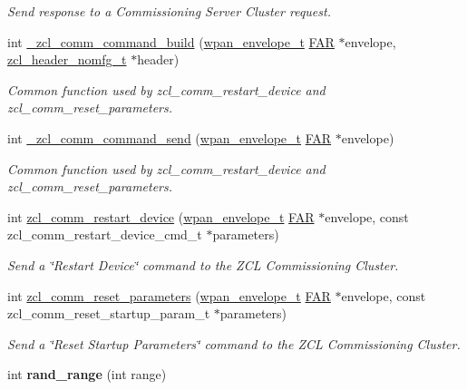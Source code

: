 \begin{DoxyCompactItemize}
\begin{DoxyCompactList}\small\item\em Send response to a Commissioning Server Cluster request. \end{DoxyCompactList}\item 
int \hyperlink{group__zcl__commissioning_ga0eeed24c2ca26aa030876addc4caf67d}{\-\_\-zcl\-\_\-comm\-\_\-command\-\_\-build} (\hyperlink{structwpan__envelope__t}{wpan\-\_\-envelope\-\_\-t} \hyperlink{group__hal_gaef060b3456fdcc093a7210a762d5f2ed}{F\-A\-R} $\ast$envelope, \hyperlink{group__zcl_gae988eb59c8a2e75b6cb34aefeca315d1}{zcl\-\_\-header\-\_\-nomfg\-\_\-t} $\ast$header)
\begin{DoxyCompactList}\small\item\em Common function used by zcl\-\_\-comm\-\_\-restart\-\_\-device and zcl\-\_\-comm\-\_\-reset\-\_\-parameters. \end{DoxyCompactList}\item 
int \hyperlink{group__zcl__commissioning_gab653d2ac290d96d3131c894f7330fbb6}{\-\_\-zcl\-\_\-comm\-\_\-command\-\_\-send} (\hyperlink{structwpan__envelope__t}{wpan\-\_\-envelope\-\_\-t} \hyperlink{group__hal_gaef060b3456fdcc093a7210a762d5f2ed}{F\-A\-R} $\ast$envelope)
\begin{DoxyCompactList}\small\item\em Common function used by zcl\-\_\-comm\-\_\-restart\-\_\-device and zcl\-\_\-comm\-\_\-reset\-\_\-parameters. \end{DoxyCompactList}\item 
int \hyperlink{group__zcl__commissioning_ga891e67720dee8334b805756597a62607}{zcl\-\_\-comm\-\_\-restart\-\_\-device} (\hyperlink{structwpan__envelope__t}{wpan\-\_\-envelope\-\_\-t} \hyperlink{group__hal_gaef060b3456fdcc093a7210a762d5f2ed}{F\-A\-R} $\ast$envelope, const zcl\-\_\-comm\-\_\-restart\-\_\-device\-\_\-cmd\-\_\-t $\ast$parameters)
\begin{DoxyCompactList}\small\item\em Send a \char`\"{}\-Restart Device\char`\"{} command to the Z\-C\-L Commissioning Cluster. \end{DoxyCompactList}\item 
int \hyperlink{group__zcl__commissioning_ga3d73d7ef453da4940c923d7d7663f8d9}{zcl\-\_\-comm\-\_\-reset\-\_\-parameters} (\hyperlink{structwpan__envelope__t}{wpan\-\_\-envelope\-\_\-t} \hyperlink{group__hal_gaef060b3456fdcc093a7210a762d5f2ed}{F\-A\-R} $\ast$envelope, const zcl\-\_\-comm\-\_\-reset\-\_\-startup\-\_\-param\-\_\-t $\ast$parameters)
\begin{DoxyCompactList}\small\item\em Send a \char`\"{}\-Reset Startup Parameters\char`\"{} command to the Z\-C\-L Commissioning Cluster. \end{DoxyCompactList}\item 
\hypertarget{group__zcl__commissioning_ga54e8b0e19100923272edbfcfec798409}{int {\bfseries rand\-\_\-range} (int range)}\label{group__zcl__commissioning_ga54e8b0e19100923272edbfcfec798409}


\end{DoxyCompactItemize}
